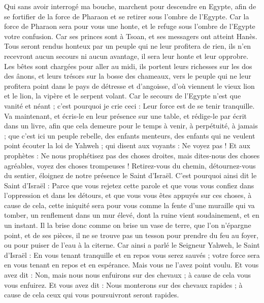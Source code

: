 \begin{multicols}{2}
Qui sans avoir interrogé ma bouche, marchent pour descendre en Egypte, afin de se fortifier de la force de Pharaon et se retirer sous l'ombre de l'Egypte.
Car la force de Pharaon sera pour vous une honte, et le refuge sous l'ombre de l'Egypte votre confusion.
Car ses princes sont à Tsoan, et ses messagers ont atteint Hanès.
Tous seront rendus honteux par un peuple qui ne leur profitera de rien, ils n'en recevront aucun secours ni aucun avantage, il sera leur honte et leur opprobre.
Les bêtes sont chargées pour aller au midi, ils portent leurs richesses sur les dos des ânons, et leurs trésors sur la bosse des chameaux, vers le peuple qui ne leur profitera point dans le pays de détresse et d'angoisse, d'où viennent le vieux lion et le lion, la vipère et le serpent volant.
Car le secours de l'Egypte n'est que vanité et néant ; c'est pourquoi je crie ceci : Leur force est de se tenir tranquille.
Va maintenant, et écris-le en leur présence sur une table, et rédige-le par écrit dans un livre, afin que cela demeure pour le temps à venir, à perpétuité, à jamais ;
que c'est ici un peuple rebelle, des enfants menteurs, des enfants qui ne veulent point écouter la loi de Yahweh ;
qui disent aux voyants : Ne voyez pas ! Et aux prophètes : Ne nous prophétisez pas des choses droites, mais dites-nous des choses agréables, voyez des choses trompeuses !
Retirez-vous du chemin, détournez-vous du sentier, éloignez de notre présence le Saint d'Israël.
C'est pourquoi ainsi dit le Saint d'Israël : Parce que vous rejetez cette parole et que vous vous confiez dans l'oppression et dans les détours, et que vous vous êtes appuyés sur ces choses,
à cause de cela, cette iniquité sera pour vous comme la fente d'une muraille qui va tomber, un renflement dans un mur élevé, dont la ruine vient soudainement, et en un instant.
Il la brise donc comme on brise un vase de terre, que l'on n'épargne point, et de ses pièces, il ne se trouve pas un tesson pour prendre du feu au foyer, ou pour puiser de l'eau à la citerne.
Car ainsi a parlé le Seigneur Yahweh, le Saint d'Israël : En vous tenant tranquille et en repos vous serez sauvés ; votre force sera en vous tenant en repos et en espérance. Mais vous ne l'avez point voulu.
Et vous avez dit : Non, mais nous nous enfuirons sur des chevaux ; à cause de cela vous vous enfuirez. Et vous avez dit : Nous monterons sur des chevaux rapides ; à cause de cela ceux qui vous poursuivront seront rapides.

\end{multicols}
